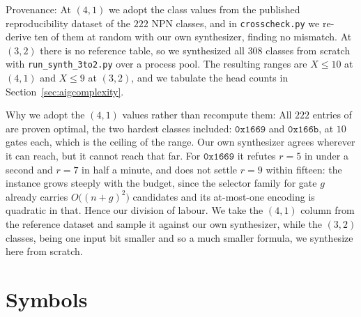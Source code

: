 \documentclass[11pt]{article}
\let\stdsection\section
\renewcommand{\section}{\clearpage\stdsection}
\begin{document}
Provenance: At $(4,1)$ we adopt the class values from the
published reproducibility dataset \cite{krinkin} of the $222$ NPN
classes, and in \texttt{crosscheck.py} we re-derive ten of them
at random with our own synthesizer, finding no mismatch. At $(3,2)$
there is no reference table, so we synthesized all $308$ classes from
scratch with \texttt{run\_synth\_3to2.py} over a process pool. The
resulting ranges are $X \le 10$ at $(4,1)$ and $X \le 9$ at $(3,2)$,
and we tabulate the head counts in Section~\ref{sec:aigcomplexity}.

Why we adopt the $(4,1)$ values rather than recompute them: All
$222$ entries of \cite{krinkin} are proven optimal, the two hardest
classes included: $\mathtt{0x1669}$ and $\mathtt{0x166b}$, at $10$
gates each, which is the ceiling of the range. Our own synthesizer
agrees wherever it can reach, but it cannot reach that far. For
$\mathtt{0x1669}$ it refutes $r = 5$ in under a second and $r = 7$ in
half a minute, and does not settle $r = 9$ within fifteen: the instance
grows steeply with the budget, since the selector family for gate $g$
already carries $O\big((n+g)^2\big)$ candidates and its at-most-one
encoding is quadratic in that. Hence our division of labour. We take the
$(4,1)$ column from the reference dataset and sample it against
our own synthesizer, while the $(3,2)$ classes, being one input bit
smaller and so a much smaller formula, we synthesize here from
scratch.

\section{Symbols}\label{app:symbols}
\end{document}
